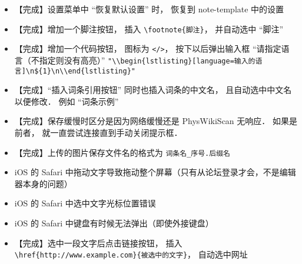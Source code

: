 \begin{itemize}
\item 【完成】设置菜单中 “恢复默认设置” 时， 恢复到 note-template 中的设置

\item 【完成】增加一个脚注按钮， 插入 \lstinline|\footnote{脚注}|， 并自动选中 “脚注”

\item 【完成】增加一个代码按钮， 图标为 \lstinline|</>|， 按下以后弹出输入框 “请指定语言（不指定则没有高亮）” \lstinline|"\\begin{lstlisting}[language=输入的语言]\n${1}\n\\end{lstlisting}"|

\item 【完成】“插入词条引用按钮” 同时也插入词条的中文名， 且自动选中中文名以便修改． 例如 “词条示例”

\item 【完成】保存缓慢时区分是因为网络缓慢还是 PhysWikiScan 无响应． 如果是前者， 就一直尝试连接直到手动关闭提示框．

\item 【完成】上传的图片保存文件名的格式为 \verb|词条名_序号.后缀名|

\item iOS 的 Safari 中拖动文字导致拖动整个屏幕（只有从论坛登录才会，不是编辑器本身的问题）

\item iOS 的 Safari 中选中文字光标位置错误

\item iOS 的 Safari 中键盘有时候无法弹出（即使外接键盘）

\item 【完成】选中一段文字后点击链接按钮， 插入 \lstinline|\href{http://www.example.com}{被选中的文字}|， 自动选中网址
\end{itemize}

